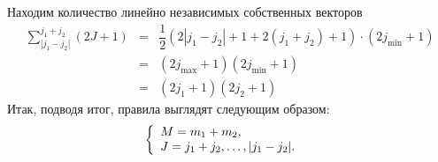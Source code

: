 Находим количество линейно независимых собственных векторов
\begin{eqnarray*}
    \sum_{|j_1 - j_2|}^{j_1 + j_2} (2J + 1) &=& \dfrac{1}{2} \left(
        2 |j_1 - j_2| + 1 + 2(j_1 + j_2) + 1
    \right) \cdot (2 j_{\min} + 1)\\
    &=& (2j_{\max} + 1)(2j_{\min} + 1)\\
    &=& (2j_1 + 1) (2j_2 + 1)
\end{eqnarray*}
Итак, подводя итог, правила выглядят следующим образом:
$$
    \left\{
      \begin{array}{ll}
        M = m_1 + m_2, & \hbox{} \\
        J = j_1 + j_2, \ldots, |j_1 - j_2|. & \hbox{}
      \end{array}
    \right.
$$
